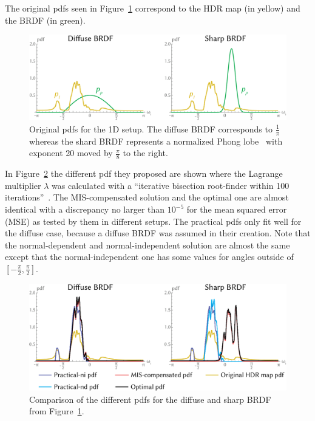 The original pdfs seen in Figure~\ref{fig:ibl_pdfs} correspond to the HDR map (in yellow) and the BRDF (in green).

\begin{figure}
    \centering
    \includegraphics[width=.7\textwidth]{images/ibl_pdfs.png}
    \caption{Original pdfs for the 1D setup.
    The diffuse BRDF corresponds to $ \frac{1}{\pi} $
    whereas the shard BRDF represents a normalized Phong lobe~\cite{phong} with exponent 20 moved by $ \frac{\pi}{8} $ to the right.
    \cite[Figure~4]{Karlik2019}}
    \label{fig:ibl_pdfs}
\end{figure}

In Figure~\ref{fig:compensated_pdfs} the different pdf they proposed are shown
where the Lagrange multiplier $ \lambda $ was calculated with a \enquote{iterative bisection root-finder within 100 iterations}~\cite[Section~6.3]{Karlik2019}.
The MIS-compensated solution and the optimal one are almost identical with a discrepancy no larger than $ 10^{-5} $
for the mean squared error (MSE) as tested by them in different setups.
The practical pdfs only fit well for the diffuse case, because a diffuse BRDF was assumed in their creation.
Note that the normal-dependent and normal-independent solution are almost the same except that the normal-independent one has some values for angles outside of $ [ -\frac{\pi}{2}, \frac{\pi}{2} ] $.

\begin{figure}
    \centering
    \includegraphics[width=.7\textwidth]{images/ibl_compensated_pdfs.png}
    \caption{Comparison of the different pdfs for the diffuse and sharp BRDF from Figure~\ref{fig:ibl_pdfs}.
    \cite[Figure~5]{Karlik2019}}
    \label{fig:compensated_pdfs}
\end{figure}

